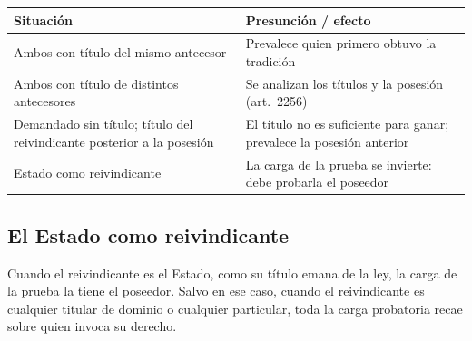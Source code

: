 \documentclass[12pt,oneside]{book}
\begin{document}

\begin{table}[H]
\centering
\small
\begin{tabularx}{\textwidth}{@{}>{\raggedright\arraybackslash}X>{\raggedright\arraybackslash}X@{}}
\toprule
\textbf{Situación} & \textbf{Presunción / efecto} \\
\midrule
Ambos con título del mismo antecesor & Prevalece quien primero obtuvo la tradición \\
Ambos con título de distintos antecesores & Se analizan los títulos y la posesión (art.~2256) \\
Demandado sin título; título del reivindicante posterior a la posesión & El título no es suficiente para ganar; prevalece la posesión anterior \\
Estado como reivindicante & La carga de la prueba se invierte: debe probarla el poseedor \\
\bottomrule
\end{tabularx}
\end{table}

\subsection{El Estado como reivindicante}

Cuando el reivindicante es el Estado, como su título emana de la ley, la carga de la prueba la tiene el poseedor. Salvo en ese caso, cuando el reivindicante es cualquier titular de dominio o cualquier particular, toda la carga probatoria recae sobre quien invoca su derecho.
\end{document}

